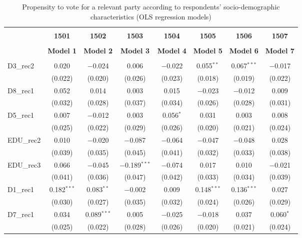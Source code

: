 \documentclass[
]{article}
\begin{document}
\begin{table}[!htbp] \centering 
  \caption{Propensity to vote for a relevant party according to respondents' 
                     socio-demographic characteristics (OLS regression models)} 
  \label{table:full_ols_it} 
\begin{tabular}{@{\extracolsep{5pt}}lccccccc} 
\\[-1.8ex]\hline \\[-1.8ex] 
 & \textbf{1501} & \textbf{1502} & \textbf{1503} & \textbf{1504} & \textbf{1505} & \textbf{1506} & \textbf{1507} \\ 
\\[-1.8ex] & \textbf{Model 1} & \textbf{Model 2} & \textbf{Model 3} & \textbf{Model 4} & \textbf{Model 5} & \textbf{Model 6} & \textbf{Model 7}\\ 
\hline \\[-1.8ex] 
 D3\_rec2 & 0.020 & $-$0.024 & 0.006 & $-$0.022 & 0.055$^{**}$ & 0.067$^{***}$ & $-$0.017 \\ 
  & (0.022) & (0.020) & (0.026) & (0.023) & (0.018) & (0.019) & (0.022) \\ 
  D8\_rec1 & 0.052 & 0.014 & 0.003 & 0.015 & $-$0.023 & $-$0.012 & 0.009 \\ 
  & (0.032) & (0.028) & (0.037) & (0.034) & (0.026) & (0.028) & (0.031) \\ 
  D5\_rec1 & 0.007 & $-$0.012 & 0.003 & 0.056$^{*}$ & 0.031 & 0.003 & 0.008 \\ 
  & (0.025) & (0.022) & (0.029) & (0.026) & (0.020) & (0.021) & (0.024) \\ 
  EDU\_rec2 & 0.010 & $-$0.020 & $-$0.087 & $-$0.064 & $-$0.047 & $-$0.048 & 0.028 \\ 
  & (0.039) & (0.035) & (0.045) & (0.041) & (0.032) & (0.033) & (0.038) \\ 
  EDU\_rec3 & 0.066 & $-$0.045 & $-$0.189$^{***}$ & $-$0.074 & 0.017 & 0.010 & $-$0.021 \\ 
  & (0.041) & (0.036) & (0.047) & (0.042) & (0.033) & (0.034) & (0.039) \\ 
  D1\_rec1 & 0.182$^{***}$ & 0.083$^{**}$ & $-$0.002 & 0.009 & 0.148$^{***}$ & 0.136$^{***}$ & 0.027 \\ 
  & (0.030) & (0.027) & (0.035) & (0.032) & (0.024) & (0.026) & (0.029) \\ 
  D7\_rec1 & 0.034 & 0.089$^{***}$ & 0.005 & $-$0.025 & $-$0.018 & 0.037 & 0.060$^{*}$ \\ 
  & (0.025) & (0.022) & (0.028) & (0.026) & (0.020) & (0.021) & (0.024) \\ 

\end{tabular}
\end{table}
\end{document}
